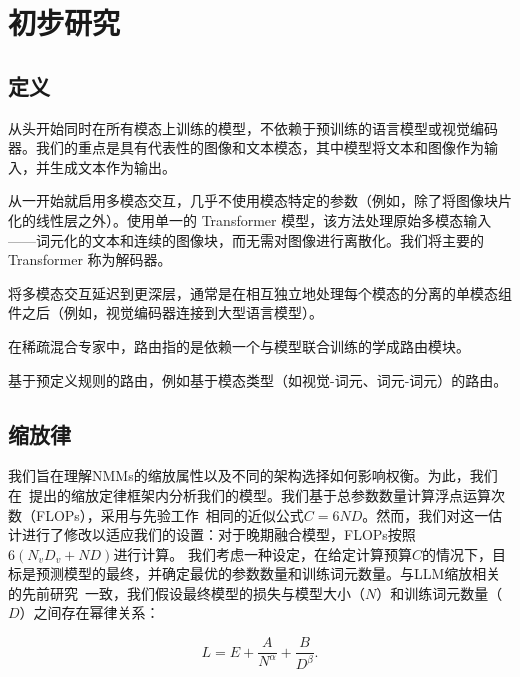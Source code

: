 \section{初步研究}



\subsection{定义}

从头开始同时在所有模态上训练的模型，不依赖于预训练的语言模型或视觉编码器。我们的重点是具有代表性的图像和文本模态，其中模型将文本和图像作为输入，并生成文本作为输出。

 从一开始就启用多模态交互，几乎不使用模态特定的参数（例如，除了将图像块片化的线性层之外）。使用单一的 Transformer 模型，该方法处理原始多模态输入——词元化的文本和连续的图像块，而无需对图像进行离散化。我们将主要的 Transformer 称为解码器。

 将多模态交互延迟到更深层，通常是在相互独立地处理每个模态的分离的单模态组件之后（例如，视觉编码器连接到大型语言模型）。

 在稀疏混合专家中，路由指的是依赖一个与模型联合训练的学成路由模块。

 基于预定义规则的路由，例如基于模态类型（如视觉-词元、词元-词元）的路由。






\subsection{缩放律}
我们旨在理解NMMs的缩放属性以及不同的架构选择如何影响权衡。为此，我们在~\citet{kaplan2020scaling,
hoffmann2022training}提出的缩放定律框架内分析我们的模型。我们基于总参数数量计算浮点运算次数（FLOPs），采用与先验工作~\citep{hoffmann2022training,abnar2025parameters}相同的近似公式\(C = 6ND\)。然而，我们对这一估计进行了修改以适应我们的设置：对于晚期融合模型，FLOPs按照\(6(N_vD_v + ND)\)进行计算。
我们考虑一种设定，在给定计算预算\(C\)的情况下，目标是预测模型的最终，并确定最优的参数数量和训练词元数量。与LLM缩放相关的先前研究~\citep{hoffmann2022training}一致，我们假设最终模型的损失与模型大小（\(N\)）和训练词元数量（\(D\)）之间存在幂律关系：




\begin{equation}
\label{eq:scaling_laws}
    L = E + \frac{A}{N^{\alpha}} + \frac{B}{D^{\beta}}.
\end{equation}



